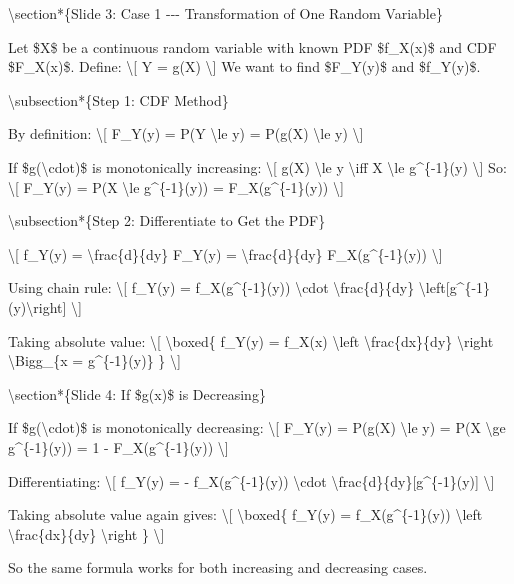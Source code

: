 \textbackslash section*\{Slide 3: Case 1 -\/-\/- Transformation of One
Random Variable\}

Let \$X\$ be a continuous random variable with known PDF \$f\_X(x)\$ and
CDF \$F\_X(x)\$. Define: \textbackslash{[} Y = g(X) \textbackslash{]} We
want to find \$F\_Y(y)\$ and \$f\_Y(y)\$.

\textbackslash subsection*\{Step 1: CDF Method\}

By definition: \textbackslash{[} F\_Y(y) = P(Y \textbackslash le y) =
P(g(X) \textbackslash le y) \textbackslash{]}

If \$g(\textbackslash cdot)\$ is monotonically increasing:
\textbackslash{[} g(X) \textbackslash le y \textbackslash iff X
\textbackslash le g\^{}\{-1\}(y) \textbackslash{]} So: \textbackslash{[}
F\_Y(y) = P(X \textbackslash le g\^{}\{-1\}(y)) = F\_X(g\^{}\{-1\}(y))
\textbackslash{]}

\textbackslash subsection*\{Step 2: Differentiate to Get the PDF\}

\textbackslash{[} f\_Y(y) = \textbackslash frac\{d\}\{dy\} F\_Y(y) =
\textbackslash frac\{d\}\{dy\} F\_X(g\^{}\{-1\}(y)) \textbackslash{]}

Using chain rule: \textbackslash{[} f\_Y(y) = f\_X(g\^{}\{-1\}(y))
\textbackslash cdot \textbackslash frac\{d\}\{dy\}
\textbackslash left{[}g\^{}\{-1\}(y)\textbackslash right{]}
\textbackslash{]}

Taking absolute value: \textbackslash{[} \textbackslash boxed\{ f\_Y(y)
= f\_X(x) \textbackslash left\textbar{} \textbackslash frac\{dx\}\{dy\}
\textbackslash right\textbar{} \textbackslash Bigg\textbar\_\{x =
g\^{}\{-1\}(y)\} \} \textbackslash{]}

\textbackslash section*\{Slide 4: If \$g(x)\$ is Decreasing\}

If \$g(\textbackslash cdot)\$ is monotonically decreasing:
\textbackslash{[} F\_Y(y) = P(g(X) \textbackslash le y) = P(X
\textbackslash ge g\^{}\{-1\}(y)) = 1 - F\_X(g\^{}\{-1\}(y))
\textbackslash{]}

Differentiating: \textbackslash{[} f\_Y(y) = - f\_X(g\^{}\{-1\}(y))
\textbackslash cdot \textbackslash frac\{d\}\{dy\}{[}g\^{}\{-1\}(y){]}
\textbackslash{]}

Taking absolute value again gives: \textbackslash{[}
\textbackslash boxed\{ f\_Y(y) = f\_X(g\^{}\{-1\}(y))
\textbackslash left\textbar{} \textbackslash frac\{dx\}\{dy\}
\textbackslash right\textbar{} \} \textbackslash{]}

So the same formula works for both increasing and decreasing cases.

